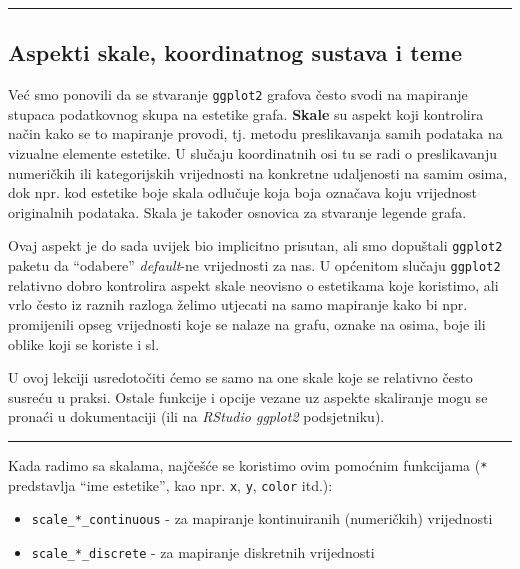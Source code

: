 \documentclass[]{book}
\providecommand{\tightlist}{%
  \setlength{\itemsep}{0pt}\setlength{\parskip}{0pt}}
\theoremstyle{definition}
\theoremstyle{definition}
\theoremstyle{definition}
\theoremstyle{remark}
\begin{document}
\begin{center}\rule{0.5\linewidth}{\linethickness}\end{center}

\subsection{Aspekti skale, koordinatnog sustava i
teme}\label{aspekti-skale-koordinatnog-sustava-i-teme}

Već smo ponovili da se stvaranje \texttt{ggplot2} grafova često svodi na
mapiranje stupaca podatkovnog skupa na estetike grafa. \textbf{Skale} su
aspekt koji kontrolira način kako se to mapiranje provodi, tj. metodu
preslikavanja samih podataka na vizualne elemente estetike. U slučaju
koordinatnih osi tu se radi o preslikavanju numeričkih ili kategorijskih
vrijednosti na konkretne udaljenosti na samim osima, dok npr. kod
estetike boje skala odlučuje koja boja označava koju vrijednost
originalnih podataka. Skala je također osnovica za stvaranje legende
grafa.

Ovaj aspekt je do sada uvijek bio implicitno prisutan, ali smo dopuštali
\texttt{ggplot2} paketu da ``odabere'' \emph{default}-ne vrijednosti za
nas. U općenitom slučaju \texttt{ggplot2} relativno dobro kontrolira
aspekt skale neovisno o estetikama koje koristimo, ali vrlo često iz
raznih razloga želimo utjecati na samo mapiranje kako bi npr.
promijenili opseg vrijednosti koje se nalaze na grafu, oznake na osima,
boje ili oblike koji se koriste i sl.

U ovoj lekciji usredotočiti ćemo se samo na one skale koje se relativno
često susreću u praksi. Ostale funkcije i opcije vezane uz aspekte
skaliranje mogu se pronaći u dokumentaciji (ili na \emph{RStudio
ggplot2} podsjetniku).

\begin{center}\rule{0.5\linewidth}{\linethickness}\end{center}

Kada radimo sa skalama, najčešće se koristimo ovim pomoćnim funkcijama
(\texttt{*} predstavlja ``ime estetike'', kao npr. \texttt{x},
\texttt{y}, \texttt{color} itd.):

\begin{itemize}
\tightlist
\item
  \texttt{scale\_*\_continuous} - za mapiranje kontinuiranih
  (numeričkih) vrijednosti
\item
  \texttt{scale\_*\_discrete} - za mapiranje diskretnih vrijednosti
\end{itemize}
\end{document}
